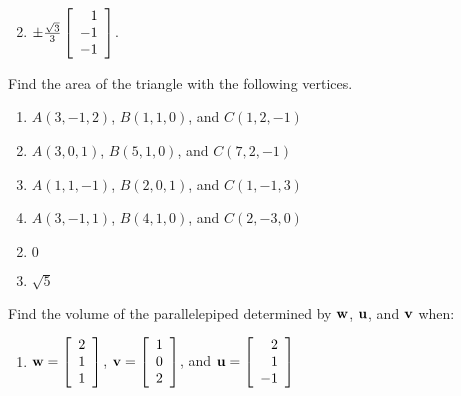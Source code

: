 \begin{multicols}{2}
\begin{ex}
\begin{enumerate}[label={\alph*.}]
\end{enumerate}
\begin{sol}
\begin{enumerate}[label={\alph*.}]
\setcounter{enumi}{1}
\item  $\pm \tfrac{\sqrt{3}}{3} \left[
\begin{array}{r}
1\\
-1\\
-1
\end{array}
\right]$.

\end{enumerate}
\end{sol}
\end{ex}

\begin{ex}
Find the area of the triangle with the following vertices.


\begin{enumerate}[label={\alph*.}]
\item $A(3, -1, 2)$, $B(1, 1, 0)$, and $C(1, 2, -1)$

\item $A(3, 0, 1)$, $B(5, 1, 0)$, and $C(7, 2, -1)$

\item $A(1, 1, -1)$, $B(2, 0, 1)$, and $C(1, -1, 3)$

\item $A(3, -1, 1)$, $B(4, 1, 0)$, and $C(2, -3, 0)$

\end{enumerate}
\begin{sol}
\begin{enumerate}[label={\alph*.}]
\setcounter{enumi}{1}
\item $0$

\setcounter{enumi}{3}
\item $\sqrt{5}$

\end{enumerate}
\end{sol}
\end{ex}

\begin{ex}
Find the volume of the parallelepiped determined by $\textbf{w}$, $\textbf{u}$, and $\textbf{v}$ when:


\begin{enumerate}[label={\alph*.}]
\item 
$\textbf{w} = \left[
\begin{array}{r}
2\\
1\\
1
\end{array}
\right]$, 
$\textbf{v} = \left[
\begin{array}{r}
1\\
0\\
2
\end{array}
\right]$, and 
$\textbf{u} = \left[
\begin{array}{r}
2\\
1\\
-1
\end{array}
\right]$


\end{enumerate}
\end{ex}
\end{multicols}
